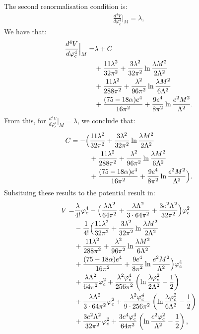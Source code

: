 The second renormalisation condition is:
\begin{align}
\frac{d^4V}{d\varphi_c^4}\Big|_M=\lambda,
\end{align}
We have that:
\begin{align}
\frac{d^4V}{d\varphi_c^4}\Big|_M = &\lambda + C \notag \\
&+\frac{11\lambda^2}{32\pi^2}+\frac{3\lambda^2}{32\pi^2}\ln\frac{\lambda M^2}{2\Lambda^2}\notag \\
&+\frac{11\lambda^2}{288\pi^2}+\frac{\lambda^2}{96\pi^2}\ln\frac{\lambda M^2}{6\Lambda^2}\notag \\
&+\frac{(75-18\alpha)e^4}{16\pi^2}+\frac{9e^4}{8\pi^2}\ln\frac{e^2M^2}{\Lambda^2}. 
\end{align}
From this, for $\frac{d^4V}{d\varphi_c^4}\Big|_M=\lambda$, we conclude that:
\begin{align}
C = -\Big(
&\frac{11\lambda^2}{32\pi^2}+\frac{3\lambda^2}{32\pi^2}\ln\frac{\lambda M^2}{2\Lambda^2}\notag \\
&+\frac{11\lambda^2}{288\pi^2}+\frac{\lambda^2}{96\pi^2}\ln\frac{\lambda M^2}{6\Lambda^2}\notag \\
&+\frac{(75-18\alpha)e^4}{16\pi^2}+\frac{9e^4}{8\pi^2}\ln\frac{e^2M^2}{\Lambda^2}
\Big).
\end{align}
Subsituing these results to the potential result in:
\begin{align}
V=&\frac{\lambda}{4!}\varphi_c^4-\Big(
\frac{\lambda\Lambda^2}{64\pi^2}+ 
\frac{\lambda\Lambda^2}{3\cdot 64\pi^2}+
\frac{3e^2\Lambda^2}{32\pi^2}\Big)\varphi_c^2 \notag \\
&-\frac{1}{4!}\Big(
\frac{11\lambda^2}{32\pi^2}+\frac{3\lambda^2}{32\pi^2}\ln\frac{\lambda M^2}{2\Lambda^2}\notag \\
&+\frac{11\lambda^2}{288\pi^2}+\frac{\lambda^2}{96\pi^2}\ln\frac{\lambda M^2}{6\Lambda^2}\notag \\
&+\frac{(75-18\alpha)e^4}{16\pi^2}+\frac{9e^4}{8\pi^2}\ln\frac{e^2M^2}{\Lambda^2}
\Big)\varphi_c^4 \notag \\
&+\frac{\lambda\Lambda^2}{64\pi^2}\varphi_c^2+\frac{\lambda^2\varphi_c^4}{256\pi^2}
\left(\ln\frac{\lambda\varphi_c^2}{2\Lambda^2}-\frac{1}{2}\right)  \notag \\
&+\frac{\lambda\Lambda^2}{3\cdot 64\pi^2}\varphi_c^2+\frac{\lambda^2\varphi_c^4}{9\cdot 256\pi^2}
\left(\ln\frac{\lambda\varphi_c^2}{6\Lambda^2}-\frac{1}{2}\right)  \notag \\
&+\frac{3e^2\Lambda^2}{32\pi^2}\varphi_c^2+\frac{3e^4\varphi_c^4}{64\pi^2}
\left(\ln\frac{e^2\varphi_c^2}{\Lambda^2}-\frac{1}{2}\right),
\end{align}

